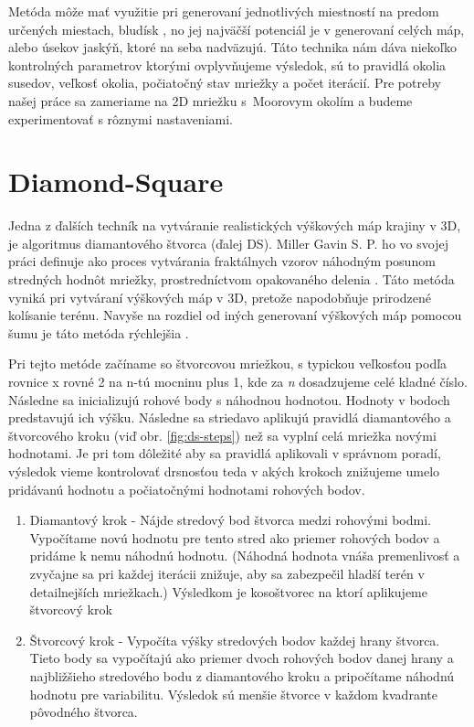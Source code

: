 Metóda môže mať využitie pri generovaní jednotlivých miestností na predom určených miestach, bludísk \cite{adams2017cellular}, no jej najväčší potenciál je v generovaní celých máp, alebo úsekov jaskýň, ktoré na seba nadväzujú. Táto technika nám dáva niekoľko kontrolných parametrov ktorými ovplyvňujeme výsledok, sú to pravidlá okolia susedov, veľkosť okolia, počiatočný stav mriežky a počet iterácií. Pre potreby našej práce sa zameriame na 2D mriežku s~Moorovym okolím a budeme experimentovať s rôznymi nastaveniami.

\section{Diamond-Square}

Jedna z ďalších techník na vytváranie realistických výškových máp krajiny v 3D, je algoritmus diamantového štvorca (ďalej DS). Miller Gavin S. P. ho vo svojej práci definuje ako proces vytvárania fraktálnych vzorov náhodným posunom stredných hodnôt mriežky, prostredníctvom opakovaného delenia \cite{miller1986diamonsquare}. Táto metóda vyniká pri vytváraní výškových máp v 3D, pretože napodobňuje prirodzené kolísanie terénu. Navyše na rozdiel od iných generovaní výškových máp pomocou šumu je táto metóda rýchlejšia \cite{rose2016brief-diamondsquare}.

Pri tejto metóde začíname so štvorcovou mriežkou, s typickou veľkosťou podľa rovnice x rovné 2 na n-tú mocninu plus 1, kde za \textit{n} dosadzujeme celé kladné číslo. Následne sa inicializujú rohové body s náhodnou hodnotou. Hodnoty v bodoch predstavujú ich výšku. Následne sa striedavo aplikujú pravidlá diamantového a štvorcového kroku (viď obr. \ref{fig:ds-steps}) než sa vyplní celá mriežka novými hodnotami. Je pri tom dôležité aby sa pravidlá aplikovali v správnom poradí, výsledok vieme kontrolovať drsnosťou teda v akých krokoch znižujeme umelo pridávanú hodnotu a počiatočnými hodnotami rohových bodov.

\begin{enumerate}
    \item Diamantový krok - Nájde stredový bod štvorca medzi rohovými bodmi. Vypočítame novú hodnotu pre tento stred ako priemer rohových bodov a pridáme k nemu náhodnú hodnotu. (Náhodná hodnota vnáša premenlivosť a zvyčajne sa pri každej iterácii znižuje, aby sa zabezpečil hladší terén v detailnejších mriežkach.) Výsledkom je kosoštvorec na ktorí aplikujeme štvorcový krok
    \item Štvorcový krok - Vypočíta výšky stredových bodov každej hrany štvorca. Tieto body sa vypočítajú ako priemer dvoch rohových bodov danej hrany a najbližšieho stredového bodu z diamantového kroku a pripočítame náhodnú hodnotu pre variabilitu. Výsledok sú menšie štvorce v každom kvadrante pôvodného štvorca.  
\end{enumerate}

